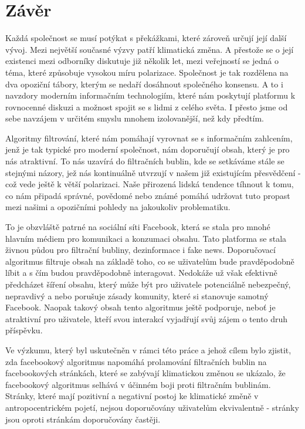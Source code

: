 \chapter*{Závěr}
\label{chapter:zaver}
Každá společnost se musí potýkat s překážkami, které zároveň určují její další vývoj. Mezi největší současné výzvy patří klimatická změna. A přestože se o její existenci mezi odborníky diskutuje již několik let, mezi veřejností se jedná o téma, které způsobuje vysokou míru polarizace. Společnost je tak rozdělena na dva opoziční tábory, kterým se nedaří dosáhnout společného konsensu. A to i navzdory moderním informačním technologiím, které nám poskytují platformu k rovnocenné diskuzi a možnost spojit se s lidmi z celého světa. I přesto jsme od sebe navzájem v určitém smyslu mnohem izolovanější, než kdy předtím. 

Algoritmy filtrování, které nám pomáhají vyrovnat se s informačním zahlcením, jenž je tak typické pro moderní společnost, nám doporučují obsah, který je pro nás atraktivní. To nás uzavírá do filtračních bublin, kde se setkáváme stále se stejnými názory, jež nás kontinuálně utvrzují v našem již existujícím přesvědčení - což vede ještě k větší polarizaci. Naše přirozená lidská tendence tíhnout k tomu, co nám připadá správné, povědomé nebo známé pomáhá udržovat tuto propast mezi našimi a opozičními pohledy na jakoukoliv problematiku.  

To je obzvláště patrné na sociální síti Facebook, která se stala pro mnohé hlavním médiem pro komunikaci a konzumaci obsahu. Tato platforma se stala živnou půdou pro filtrační bubliny, dezinformace i fake news. Doporučovací algoritmus filtruje obsah na základě toho, co se uživatelům bude pravděpodobně líbit a s čím budou pravděpodobně interagovat. Nedokáže už však efektivně předcházet šíření obsahu, který může být pro uživatele potenciálně nebezpečný, nepravdivý a nebo porušuje zásady komunity, které si stanovuje samotný Facebook. Naopak takový obsah tento algoritmus ještě podporuje, neboť je atraktivní pro uživatele, kteří svou interakcí vyjadřují svůj zájem o tento druh příspěvku. 

Ve výzkumu, který byl uskutečněn v rámci této práce a jehož cílem bylo zjistit, zda facebookový algoritmus napomáhá prolamování filtračních bublin na facebookových stránkách, které se zabývají klimatickou změnou se ukázalo, že facebookový algoritmus selhává v účinném boji proti filtračním bublinám. Stránky, které mají pozitivní a negativní postoj ke klimatické změně v antropocentrickém pojetí, nejsou doporučovány uživatelům ekvivalentně - stránky  jsou oproti stránkám  doporučovány častěji.

